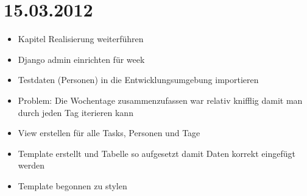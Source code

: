\section{15.03.2012}
\begin{itemize}
    \item Kapitel Realisierung weiterführen
    \item Django admin einrichten für week
    \item Testdaten (Personen) in die Entwicklungsumgebung importieren
    \item Problem: Die Wochentage zusammenzufassen war relativ knifflig damit man durch jeden Tag iterieren kann
    \item View erstellen für alle Tasks, Personen und Tage
    \item Template erstellt und Tabelle so aufgesetzt damit Daten korrekt eingefügt werden
    \item Template begonnen zu stylen
\end{itemize}
